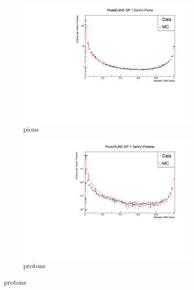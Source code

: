 \begin{figure}

	\centering

	\begin{subfigure}[b]{0.7\textwidth}
		\centering
		\includegraphics[width=\textwidth]{figures/hit_cnn_pion.pdf}
		\caption {pions}
		\label{fig:beam_pi_cnn}
	\end{subfigure}

	\begin{subfigure}[b]{0.7\textwidth}
		\centering
		\includegraphics[width=\textwidth]{figures/hit_cnn_proton.pdf}
		\caption {protons}
		\label{fig:beam_proton_cnn}
	\end{subfigure}


\end{figure}
